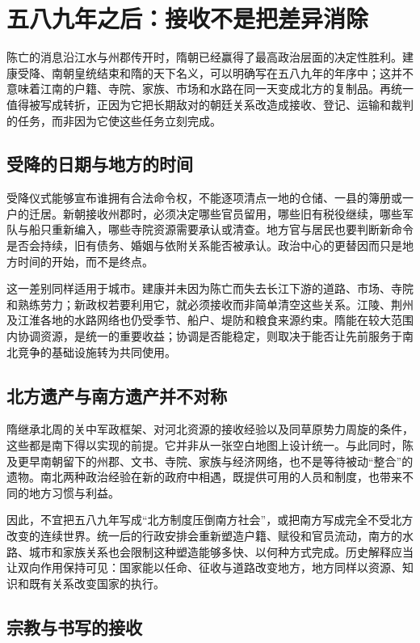 \section{五八九年之后：接收不是把差异消除}
\label{sec:synthesis-reunification-afterlives}

陈亡的消息沿江水与州郡传开时，隋朝已经赢得了最高政治层面的决定性胜利。建康受降、南朝皇统结束和隋的天下名义，可以明确写在五八九年的年序中；这并不意味着江南的户籍、寺院、家族、市场和水路在同一天变成北方的复制品。再统一值得被写成转折，正因为它把长期敌对的朝廷关系改造成接收、登记、运输和裁判的任务，而非因为它使这些任务立刻完成。

\subsection{受降的日期与地方的时间}

受降仪式能够宣布谁拥有合法命令权，不能逐项清点一地的仓储、一县的簿册或一户的迁居。新朝接收州郡时，必须决定哪些官员留用，哪些旧有税役继续，哪些军队与船只重新编入，哪些寺院资源需要承认或清查。地方官与居民也要判断新命令是否会持续，旧有债务、婚姻与依附关系能否被承认。政治中心的更替因而只是地方时间的开始，而不是终点。

这一差别同样适用于城市。建康并未因为陈亡而失去长江下游的道路、市场、寺院和熟练劳力；新政权若要利用它，就必须接收而非简单清空这些关系。江陵、荆州及江淮各地的水路网络也仍受季节、船户、堤防和粮食来源约束。隋能在较大范围内协调资源，是统一的重要收益；协调是否能稳定，则取决于能否让先前服务于南北竞争的基础设施转为共同使用。

\subsection{北方遗产与南方遗产并不对称}

隋继承北周的关中军政框架、对河北资源的接收经验以及同草原势力周旋的条件，这些都是南下得以实现的前提。它并非从一张空白地图上设计统一。与此同时，陈及更早南朝留下的州郡、文书、寺院、家族与经济网络，也不是等待被动“整合”的遗物。南北两种政治经验在新的政府中相遇，既提供可用的人员和制度，也带来不同的地方习惯与利益。

因此，不宜把五八九年写成“北方制度压倒南方社会”，或把南方写成完全不受北方改变的连续世界。统一后的行政安排会重新塑造户籍、赋役和官员流动，南方的水路、城市和家族关系也会限制这种塑造能够多快、以何种方式完成。历史解释应当让双向作用保持可见：国家能以任命、征收与道路改变地方，地方同样以资源、知识和既有关系改变国家的执行。

\subsection{宗教与书写的接收}

